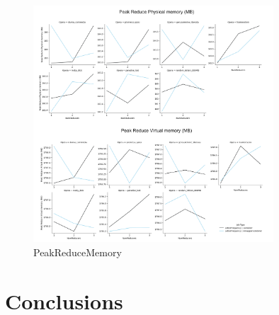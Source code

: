 \documentclass[a4paper, 12pt]{article}
\begin{document}
\begin{figure}[ht!]
  \centering
  \includegraphics[width=0.8\textwidth]{media/performance/PeakReduceMemory.png}
  \caption{PeakReduceMemory}
  \label{fig:PeakReduceMemory}
\end{figure}


\section{Conclusions}
\end{document}
